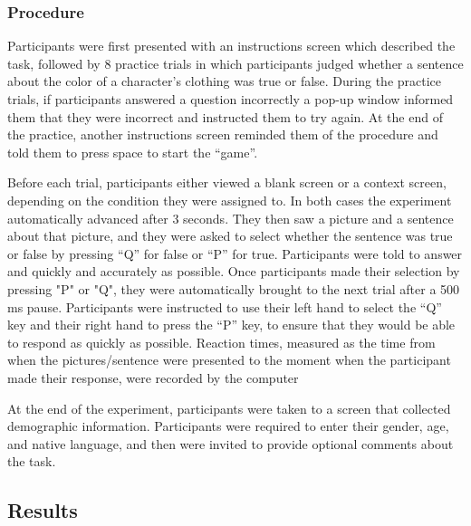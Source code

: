 \documentclass[10pt,letterpaper]{article}
\begin{document}
\subsubsection{Procedure}

Participants were first presented with an instructions screen which described the task, followed by 8 practice trials in which participants judged whether a sentence about the color of a character's clothing was true or false.  During the practice trials, if participants answered a question incorrectly a pop-up window informed them that they were incorrect and instructed them to try again.  At the end of the practice, another instructions screen reminded them of the procedure and told them to press space to start the ``game''.  

Before each trial, participants either viewed a blank screen or a context screen, depending on the condition they were assigned to.  In both cases the experiment automatically advanced after 3 seconds.  They then saw a picture and a sentence about that picture, and they were asked to select whether the sentence was true or false by pressing ``Q'' for false or ``P'' for true.  Participants were told to answer and quickly and accurately as possible.  Once participants made their selection by pressing "P" or "Q", they were automatically brought to the next trial after a 500 ms pause.  Participants were instructed to use their left hand to select the ``Q'' key and their right hand to press the ``P'' key, to ensure that they would be able to respond as quickly as possible.  Reaction times, measured as the time from when the pictures/sentence were presented to the moment when the participant made their response, were recorded by the computer 

At the end of the experiment, participants were taken to a screen that collected demographic information.  Participants were required to enter their gender, age, and native language, and then were invited to provide optional comments about the task.  

\subsection{Results}
\end{document}
